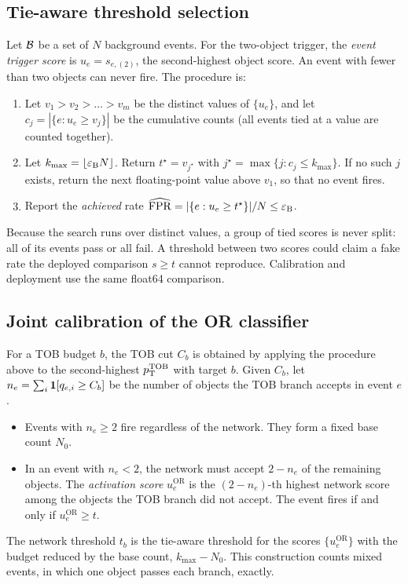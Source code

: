 \subsection{Tie-aware threshold selection}
Let $\mathcal{B}$ be a set of $N$ background events. For the two-object trigger, the \emph{event trigger score} is $u_e=s_{e,(2)}$, the second-highest object score. An event with fewer than two objects can never fire. The procedure is:
\begin{enumerate}
  \item Let $v_1>v_2>\dots>v_m$ be the distinct values of $\{u_e\}$, and let $c_j=|\{e:u_e\geq v_j\}|$ be the cumulative counts (all events tied at a value are counted together).
  \item Let $k_{\max}=\lfloor\varepsilon_{\mathrm{B}} N\rfloor$. Return $t^\star=v_{j^\star}$ with $j^\star=\max\{j:c_j\leq k_{\max}\}$. If no such $j$ exists, return the next floating-point value above $v_1$, so that no event fires.
  \item Report the \emph{achieved} rate $\widehat{\mathrm{FPR}}=|\{e:u_e\geq t^\star\}|/N\leq\varepsilon_{\mathrm{B}}$.
\end{enumerate}
Because the search runs over distinct values, a group of tied scores is never split: all of its events pass or all fail. A threshold between two scores could claim a fake rate the deployed comparison $s\geq t$ cannot reproduce. Calibration and deployment use the same float64 comparison.

\subsection{Joint calibration of the OR classifier}
For a TOB budget $b$, the TOB cut $C_b$ is obtained by applying the procedure above to the second-highest $p_{\mathrm{T}}^{\mathrm{TOB}}$ with target $b$. Given $C_b$, let $n_e=\sum_i\mathbf{1}[q_{e,i}\geq C_b]$ be the number of objects the TOB branch accepts in event $e$.
\begin{itemize}
  \item Events with $n_e\geq2$ fire regardless of the network. They form a fixed base count $N_0$.
  \item In an event with $n_e<2$, the network must accept $2-n_e$ of the remaining objects. The \emph{activation score} $u_e^{\mathrm{OR}}$ is the $(2-n_e)$-th highest network score among the objects the TOB branch did not accept. The event fires if and only if $u_e^{\mathrm{OR}}\geq t$.
\end{itemize}
The network threshold $t_b$ is the tie-aware threshold for the scores $\{u_e^{\mathrm{OR}}\}$ with the budget reduced by the base count, $k_{\max}-N_0$. This construction counts mixed events, in which one object passes each branch, exactly.

